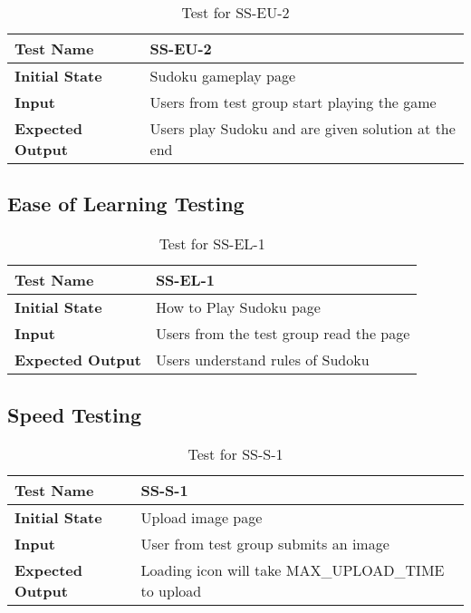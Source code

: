 \documentclass[11pt]{article}
\begin{document}
\begin{table}[H]
\centering
\begin{tabularx}{\textwidth}{p{5cm}X}
\hline
\textbf{Test Name}       &  SS-EU-2\\ \hline
\textbf{Initial State}   &  Sudoku gameplay page\\ \hline
\textbf{Input}           &  Users from test group start playing the game\\ \hline
\textbf{Expected Output} &   Users play Sudoku and are given solution at the end\\ \hline
\end{tabularx}
\caption{Test for SS-EU-2}
\end{table}

\subsection{Ease of Learning Testing}
\begin{table}[H]
\centering
\begin{tabularx}{\textwidth}{p{5cm}X}
\hline
\textbf{Test Name}       &  SS-EL-1\\ \hline
\textbf{Initial State}   &  How to Play Sudoku page\\ \hline
\textbf{Input}           &  Users from the test group read the page\\ \hline
\textbf{Expected Output} &  Users understand rules of Sudoku\\ \hline
\end{tabularx}
\caption{Test for SS-EL-1}
\end{table}

\subsection{Speed Testing}
\begin{table}[H]
\centering
\begin{tabularx}{\textwidth}{p{5cm}X}
\hline
\textbf{Test Name}       &  SS-S-1\\ \hline
\textbf{Initial State}   &  Upload image page\\ \hline
\textbf{Input}           &  User from test group submits an image\\ \hline
\textbf{Expected Output} &  Loading icon will take MAX\_UPLOAD\_TIME to upload\\ \hline
\end{tabularx}
\caption{Test for SS-S-1}
\end{table}
\end{document}
